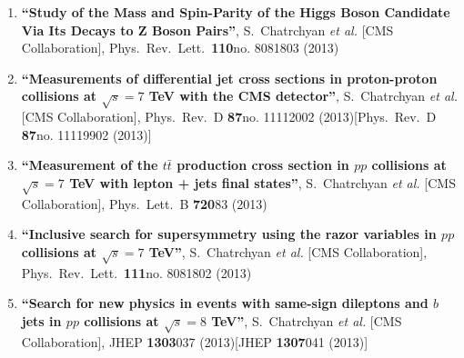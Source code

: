 \begin{enumerate}
\item%
{\bf ``Study of the Mass and Spin-Parity of the Higgs Boson Candidate Via Its Decays to Z Boson Pairs''}, 
  S.~Chatrchyan {\it et al.}  [CMS Collaboration], 
Phys.\ Rev.\ Lett.\  {\bf 110}no. 8081803 (2013) %


\item%
{\bf ``Measurements of differential jet cross sections in proton-proton collisions at $\sqrt{s}=7$ TeV with the CMS detector''}, 
  S.~Chatrchyan {\it et al.}  [CMS Collaboration], 
Phys.\ Rev.\ D {\bf 87}no. 11112002 (2013)[Phys.\ Rev.\ D {\bf 87}no. 11119902 (2013)] %


\item%
{\bf ``Measurement of the $t\bar{t}$ production cross section in $pp$ collisions at $\sqrt{s}=7$ TeV with lepton + jets final states''}, 
  S.~Chatrchyan {\it et al.}  [CMS Collaboration], 
Phys.\ Lett.\ B {\bf 720}83 (2013) %


\item%
{\bf ``Inclusive search for supersymmetry using the razor variables in $pp$ collisions at $\sqrt{s}=7$ TeV''}, 
  S.~Chatrchyan {\it et al.}  [CMS Collaboration], 
Phys.\ Rev.\ Lett.\  {\bf 111}no. 8081802 (2013) %


\item%
{\bf ``Search for new physics in events with same-sign dileptons and $b$ jets in $pp$ collisions at $\sqrt{s}=8$ TeV''}, 
  S.~Chatrchyan {\it et al.}  [CMS Collaboration], 
JHEP {\bf 1303}037 (2013)[JHEP {\bf 1307}041 (2013)] %



\end{enumerate}
